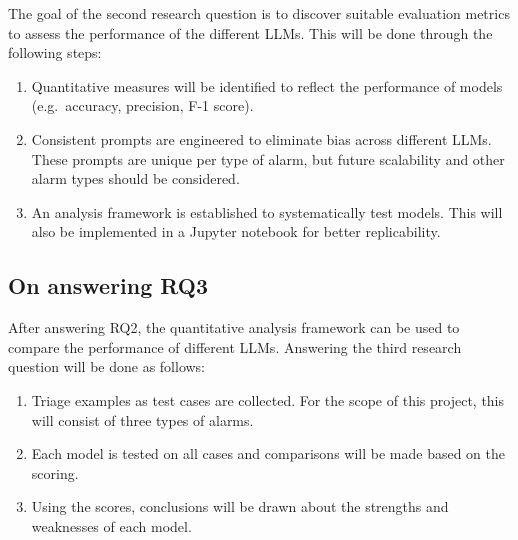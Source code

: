 The goal of the second research question is to discover suitable evaluation metrics to assess the performance of the
different LLMs.
This will be done through the following steps:

\begin{enumerate}
    \item Quantitative measures will be identified to reflect the performance of models (e.g.\ accuracy, precision,
    F-1 score).
    \item Consistent prompts are engineered to eliminate bias across different LLMs.
    These prompts are unique per type of alarm, but future scalability and other alarm types should be considered.
    \item An analysis framework is established to systematically test models.
    This will also be implemented in a Jupyter notebook for better replicability.
\end{enumerate}


\subsection{On answering RQ3}
\label{subsec:on-answering-rq3}
After answering RQ2, the quantitative analysis framework can be used to compare the performance of different LLMs.
Answering the third research question will be done as follows:

\begin{enumerate}
    \item Triage examples as test cases are collected.
    For the scope of this project, this will consist of three types of alarms.
    \item Each model is tested on all cases and comparisons will be made based on the scoring.
    \item Using the scores, conclusions will be drawn about the strengths and weaknesses of each model.
\end{enumerate}